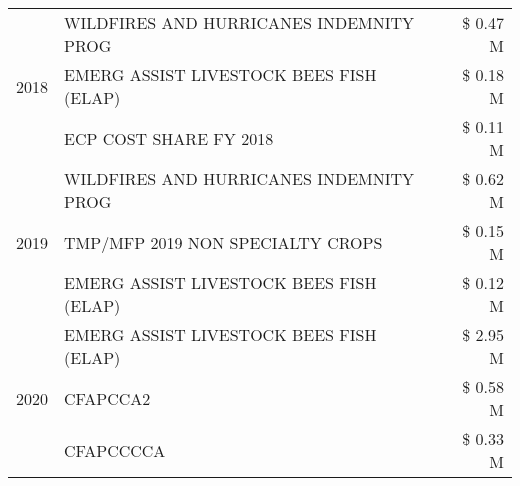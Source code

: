 \begin{tabular}{llr}
\cline{1-3}
\multirow[t]{3}{*}{2018} & WILDFIRES AND HURRICANES INDEMNITY PROG & \$ 0.47 M \\
 & EMERG ASSIST LIVESTOCK BEES FISH (ELAP) & \$ 0.18 M \\
 & ECP COST SHARE FY 2018 & \$ 0.11 M \\
\cline{1-3}
\multirow[t]{3}{*}{2019} & WILDFIRES AND HURRICANES INDEMNITY PROG & \$ 0.62 M \\
 & TMP/MFP 2019 NON SPECIALTY CROPS & \$ 0.15 M \\
 & EMERG ASSIST LIVESTOCK BEES FISH (ELAP) & \$ 0.12 M \\
\cline{1-3}
\multirow[t]{3}{*}{2020} & EMERG ASSIST LIVESTOCK BEES FISH (ELAP) & \$ 2.95 M \\
 & CFAPCCA2 & \$ 0.58 M \\
 & CFAPCCCCA & \$ 0.33 M \\
\cline{1-3}
\bottomrule
\end{tabular}
